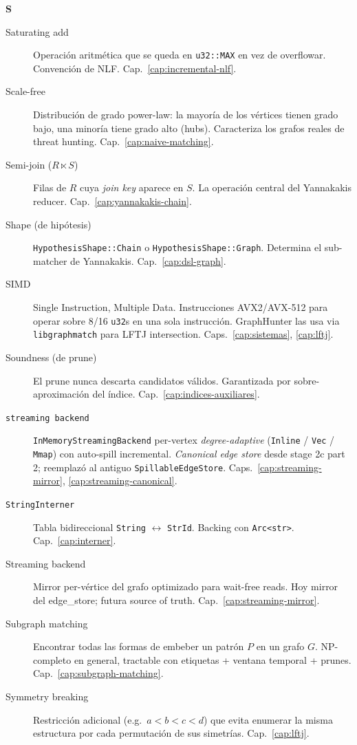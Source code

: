 \noindent
\textbf{S}

\begin{description}
    \item[Saturating add] Operación aritmética que se queda en
    \texttt{u32::MAX} en vez de overflowar. Convención de NLF.
    Cap.~\ref{cap:incremental-nlf}.

    \item[Scale-free] Distribución de grado power-law: la mayoría
    de los vértices tienen grado bajo, una minoría tiene grado
    alto (hubs). Caracteriza los grafos reales de threat hunting.
    Cap.~\ref{cap:naive-matching}.

    \item[Semi-join (\(R \ltimes S\))] Filas de \(R\) cuya
    \emph{join key} aparece en \(S\). La operación central del
    Yannakakis reducer. Cap.~\ref{cap:yannakakis-chain}.

    \item[Shape (de hipótesis)] \texttt{HypothesisShape::Chain}
    o \texttt{HypothesisShape::Graph}. Determina el sub-matcher
    de Yannakakis. Cap.~\ref{cap:dsl-graph}.

    \item[SIMD] Single Instruction, Multiple Data. Instrucciones
    AVX2/AVX-512 para operar sobre 8/16 \texttt{u32}s en una sola
    instrucción. GraphHunter las usa via \texttt{libgraphmatch}
    para LFTJ intersection. Caps.~\ref{cap:sistemas}, \ref{cap:lftj}.

    \item[Soundness (de prune)] El prune nunca descarta candidatos
    válidos. Garantizada por sobre-aproximación del índice.
    Cap.~\ref{cap:indices-auxiliares}.

    \item[\texttt{streaming backend}]
    \texttt{InMemoryStreamingBackend} per-vertex \emph{degree-adaptive}
    (\texttt{Inline} / \texttt{Vec} / \texttt{Mmap}) con auto-spill
    incremental. \emph{Canonical edge store} desde stage 2c part 2;
    reemplazó al antiguo \texttt{SpillableEdgeStore}.
    Caps.~\ref{cap:streaming-mirror}, \ref{cap:streaming-canonical}.

    \item[\texttt{StringInterner}] Tabla bidireccional
    \texttt{String} $\leftrightarrow$ \texttt{StrId}. Backing con
    \texttt{Arc<str>}. Cap.~\ref{cap:interner}.

    \item[Streaming backend] Mirror per-vértice del grafo
    optimizado para wait-free reads. Hoy mirror del edge\_store;
    futura source of truth. Cap.~\ref{cap:streaming-mirror}.

    \item[Subgraph matching] Encontrar todas las formas de embeber
    un patrón \(P\) en un grafo \(G\). NP-completo en general,
    tractable con etiquetas + ventana temporal + prunes.
    Cap.~\ref{cap:subgraph-matching}.

    \item[Symmetry breaking] Restricción adicional (e.g.\
    \(a < b < c < d\)) que evita enumerar la misma estructura por
    cada permutación de sus simetrías. Cap.~\ref{cap:lftj}.
\end{description}

